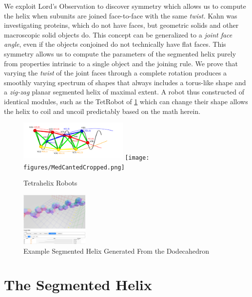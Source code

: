 \documentclass{svproc}
\begin{document}
We exploit Lord's Observation to discover symmetry which allows us to compute the helix when subunits are joined face-to-face with
the same {\em twist.} Kahn was investigating proteins, which do not have faces, but geometric solids and other macroscopic solid objects do.
This concept can be generalized to a {\em joint face angle}, even if the
objects conjoined do not technically have flat faces.
This symmetry allows us to compute the parameters of the segmented helix purely from
properties intrinsic to a single object and the joining rule.
We prove that varying the {\em twist} of the joint faces through a complete rotation produces a smoothly varying
spectrum of shapes that always includes a torus-like shape and a
{\em zig-zag} planar segmented helix of maximal extent.
A robot thus constructed of identical modules, such as the TetRobot of \ref{fig:tetrahelices} which can change their shape allows the helix to coil and uncoil
predictably based on the math herein.


\begin{figure}
  \centering

{\includegraphics[width=0.48\textwidth]{figures/UnifiedDrawing.png}}
{\texttt{[image: figures/MedCantedCropped.png]}}
\caption{Tetrahelix Robots}\label{fig:tetrahelices}
\end{figure}

\begin{figure}
     \centering
     \includegraphics[width=0.30\textwidth]{figures/Dodecahedral.png}
     \caption{Example Segmented Helix Generated From the Dodecahedron}
  \label{fig:dodecahedron}
\end{figure}

\section{The Segmented Helix}
\end{document}
